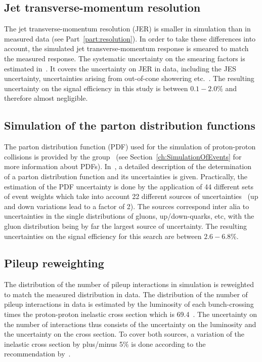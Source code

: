 \subsection*{Jet transverse-momentum resolution}
The jet transverse-momentum resolution (JER) is smaller in simulation than in measured data (see Part~\ref{part:resolution}). 
In order to take these differences into account, the simulated jet transverse-momentum response is smeared to match the measured response.
The systematic uncertainty on the smearing factors is estimated in~\cite{bib:CMS:JME_PAS,bib:Kristin_Thesis}.
It covers the uncertainty on JER in data, including the JES uncertainty, uncertainties arising from out-of-cone showering etc.~\cite{bib:CMS:JME_PAS,bib:Kristin_Thesis}.
The resulting uncertainty on the signal efficiency in this study is between $0.1-2.0\%$ and therefore almost negligible.

\subsection*{Simulation of the parton distribution functions}
The parton distribution function (PDF) used for the simulation of proton-proton collisions is provided by the \cteq group~\cite{Pumplin:2002vw} (see Section~\ref{ch:SimulationOfEvents} for more information about PDFs).
In~\cite{Pumplin:2002vw}, a detailed description of the determination of a parton distribution function and its uncertainties is given.
Practically, the estimation of the PDF uncertainty is done by the application of 44 different sets of event weights which take into account 22 different sources of uncertainties~\cite{Botje:2011sn,bib:PDF_practical} 
(up and down variations lead to a factor of 2).
The sources correspond inter alia to uncertainties in the single distributions of gluons, up/down-quarks, etc, with the gluon distribution being by far the largest source of uncertainty.
The resulting uncertainties on the signal efficiency for this search are between $2.6-6.8\%$.

\subsection*{Pileup reweighting}
The distribution of the number of pileup interactions in simulation is reweighted to match the measured distribution in data.
The distribution of the number of pileup interactions in data is estimated by the luminosity of each bunch-crossing times the proton-proton inelastic cross section which is 69.4\mb~\cite{bib:CMS:PileupUtilities}.
The uncertainty on the number of interactions thus consists of the uncertainty on the luminosity and the uncertainty on the cross section.
To cover both sources, a variation of the inelastic cross section by plus/minus 5\% is done according to the recommendation by~\cite{bib:CMS:PileupSysUnc}.

